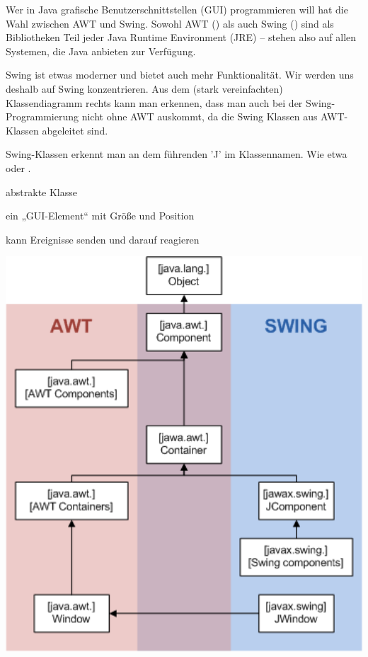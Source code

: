 \begin{minipage}{0.45\textwidth}
Wer in Java grafische Benutzerschnittstellen (GUI) programmieren will hat die
Wahl zwischen AWT und Swing. Sowohl AWT () als auch Swing
() sind als Bibliotheken Teil jeder Java Runtime
Environment (JRE) – stehen also auf allen Systemen, die Java anbieten zur Verfügung.

Swing ist etwas moderner und bietet auch mehr Funktionalität. Wir werden uns
deshalb auf Swing konzentrieren. Aus dem (stark vereinfachten) Klassendiagramm
rechts kann man erkennen, dass man auch bei der Swing-Programmierung nicht ohne
AWT auskommt, da die Swing Klassen aus AWT-Klassen abgeleitet sind.

Swing-Klassen erkennt man an dem führenden 'J' im Klassennamen. Wie etwa
 oder .


\begin{compactitem}
\item[\myClass{java.awt.Component}]\hfill
  \begin{compactitem}[$\bullet$]
  \item abstrakte Klasse
  \item ein „GUI-Element“ mit Größe und Position
  \item kann Ereignisse senden und darauf reagieren  
  \end{compactitem}
\end{compactitem}

\end{minipage}
\hfill
\begin{minipage}{0.5\textwidth}
\includegraphics[width=1.0\textwidth]{./inf/SEKII/23_Java_Frames/AWTSwingClassHierarchy.png}
\end{minipage}

